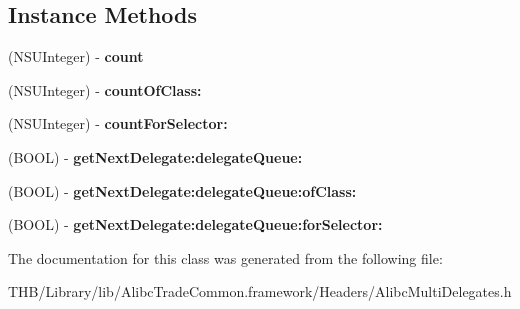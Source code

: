 \subsection*{Instance Methods}
\begin{DoxyCompactItemize}
\item 
\mbox{\label{interface_alibc_multi_delegate_enumerator_a7cc509ddea09e2c2a9315f8825508278}} 
(N\+S\+U\+Integer) -\/ {\bfseries count}
\item 
\mbox{\label{interface_alibc_multi_delegate_enumerator_a35fc40d4c37290a7a07280ba39cea776}} 
(N\+S\+U\+Integer) -\/ {\bfseries count\+Of\+Class\+:}
\item 
\mbox{\label{interface_alibc_multi_delegate_enumerator_a3c182ebfa25f0c9cfd0552c64ae355e2}} 
(N\+S\+U\+Integer) -\/ {\bfseries count\+For\+Selector\+:}
\item 
\mbox{\label{interface_alibc_multi_delegate_enumerator_ac6170f15130a767f0de85a4d39755ab9}} 
(B\+O\+OL) -\/ {\bfseries get\+Next\+Delegate\+:delegate\+Queue\+:}
\item 
\mbox{\label{interface_alibc_multi_delegate_enumerator_a6c9c4ea56406d231f67f416695a76e08}} 
(B\+O\+OL) -\/ {\bfseries get\+Next\+Delegate\+:delegate\+Queue\+:of\+Class\+:}
\item 
\mbox{\label{interface_alibc_multi_delegate_enumerator_a0f62f25ada5814f9114082dca74abde6}} 
(B\+O\+OL) -\/ {\bfseries get\+Next\+Delegate\+:delegate\+Queue\+:for\+Selector\+:}
\end{DoxyCompactItemize}


The documentation for this class was generated from the following file\+:\begin{DoxyCompactItemize}
\item 
T\+H\+B/\+Library/lib/\+Alibc\+Trade\+Common.\+framework/\+Headers/Alibc\+Multi\+Delegates.\+h\end{DoxyCompactItemize}
